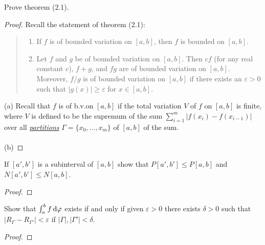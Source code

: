 \begin{problem}
Prove theorem (2.1).
\end{problem}
\begin{proof}
Recall the statement of theorem (2.1):
\begin{quote}
\begin{enumerate}[label=(\alph*)]
\item If $f$ is of bounded variation on $[a,b]$, then $f$ is bounded on
  $[a,b]$.
\item Let $f$ and $g$ be of bounded variation on $[a,b]$. Then $cf$ (for
  any real constant $c$), $f+g$, and $fg$ are of bounded variation on
  $[a,b]$. Moreover, $f/g$ is of bounded variation on $[a,b]$ if there
  exists an $\varepsilon>0$ such that $|g(x)|\geq\varepsilon$ for
  $x\in[a,b]$.
\end{enumerate}
\end{quote}
\noindent
(a) Recall that $f$ is of b.v.\@ on $[a,b]$ if the
total variation $V$ of $f$ on $[a,b]$ is finite, where $V$ is defined to be
the supremum of the sum $\sum_{i=1}^m|f(x_i)-f(x_{i-1})|$ over all
\href{https://en.wikipedia.org/wiki/Partition_of_an_interval}{\emph{partitions}}
$\Gamma=\{x_0,\dotsc,x_m\}$ of $[a,b]$ of the sum.
\\\\
(b)
\end{proof}

\begin{problem}
If $[a',b']$ is a subinterval of $[a,b]$ show that $P[a',b']\leq P[a,b]$
and $N[a',b']\leq N[a,b]$.
\end{problem}
\begin{proof}
\end{proof}
\begin{problem}
Show that $\int_a^bf\mathop{}\!\mathrm{d}\varphi$ exists if and only if given $\varepsilon>0$
there exists $\delta>0$ such that
$\left|R_\Gamma-R_{\Gamma'}\right|<\varepsilon$ if
$|\Gamma|,|\Gamma'|<\delta$.
\end{problem}
\begin{proof}
\end{proof}

